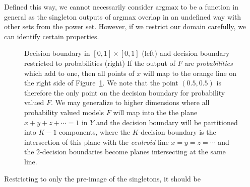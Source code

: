 Defined this way, we cannot necessarily consider $\text{argmax}$ to be a function in general as the singleton outputs of argmax overlap in an undefined way with other sets from the power set. However, if we restrict our domain carefully, we can identify certain properties. 
\begin{figure}[!ht]
\begin{center}

\caption{Decision boundary in $[0,1] \times [0,1]$ (left) and decision boundary restricted to probabilities (right) If the output of $F$ are \emph{probabilities} which add to one, then all points of $x$ will map to the orange line on the right side of Figure~\ref{fig:pdb}. We note that the point $(0.5, 0.5)$ is therefore the only point on the decision boundary for probability valued $F$. We may generalize to higher dimensions where all probability valued models $F$ will map into the the plane $x + y + z + \cdots = 1$ in $Y$ and the decision boundary will be partitioned into $K-1$ components, where the $K$-decision boundary is the intersection of this plane with the \emph{centroid} line $x = y = z = \cdots$ and the $2$-decision boundaries become planes intersecting at the same line. }
\label{fig:pdb}
\end{center}
\end{figure}
Restricting to only the pre-image of the singletons, it should be
